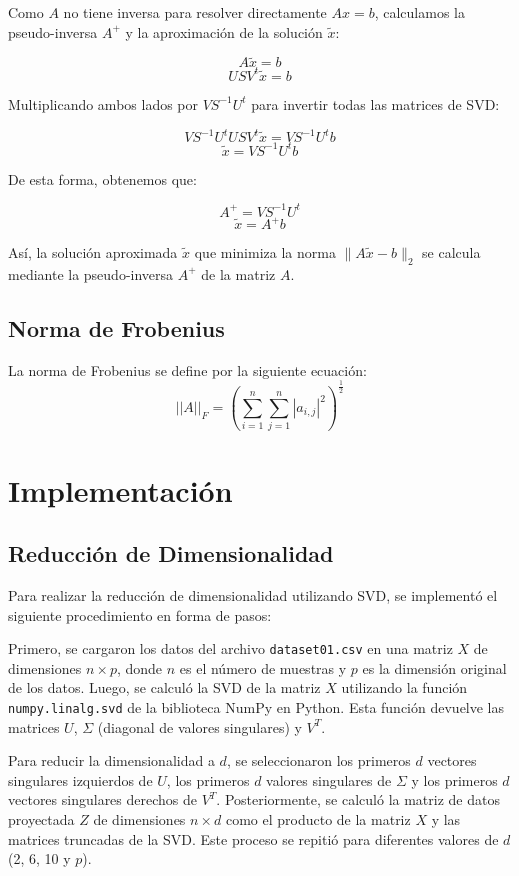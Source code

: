 \documentclass[12pt,a4]{article} %
\begin{document}
Como $A$ no tiene inversa para resolver directamente $Ax = b$, calculamos la pseudo-inversa $A^+$ y la aproximación de la solución $\tilde{x}$:

\[
A\tilde{x} = b
\]
\[
US V^t \tilde{x} = b
\]

Multiplicando ambos lados por $VS^{-1}U^t$ para invertir todas las matrices de SVD:

\[
VS^{-1}U^tUSV^t\tilde{x} = VS^{-1}U^tb
\]
\[
\tilde{x} = VS^{-1}U^tb
\]

De esta forma, obtenemos que:

\[
A^+ = VS^{-1}U^t
\]
\[
\tilde{x} = A^+b
\]

Así, la solución aproximada $\tilde{x}$ que minimiza la norma $\|A\tilde{x} - b\|_2$ se calcula mediante la pseudo-inversa $A^+$ de la matriz $A$.
\\

\subsection{Norma de Frobenius}
\label{Frobenius}
La norma de Frobenius se define por la siguiente ecuación:
\begin{equation}
    ||A||_F = \left(\sum_{i=1}^{n}\sum_{j=1}^{n} |a_{i,j}|^{2}\right)^{\frac{1}{2}}
\end{equation}

\section{Implementación}
\subsection{Reducción de Dimensionalidad}
Para realizar la reducción de dimensionalidad utilizando SVD, se implementó el siguiente procedimiento en forma de pasos:

Primero, se cargaron los datos del archivo \texttt{dataset01.csv} en una matriz $X$ de dimensiones $n \times p$, donde $n$ es el número de muestras y $p$ es la dimensión original de los datos. Luego, se calculó la SVD de la matriz $X$ utilizando la función \texttt{numpy.linalg.svd} de la biblioteca NumPy en Python. Esta función devuelve las matrices $U$, $\Sigma$ (diagonal de valores singulares) y $V^T$.

Para reducir la dimensionalidad a $d$, se seleccionaron los primeros $d$ vectores singulares izquierdos de $U$, los primeros $d$ valores singulares de $\Sigma$ y los primeros $d$ vectores singulares derechos de $V^T$. Posteriormente, se calculó la matriz de datos proyectada $Z$ de dimensiones $n \times d$ como el producto de la matriz $X$ y las matrices truncadas de la SVD. Este proceso se repitió para diferentes valores de $d$ (2, 6, 10 y $p$).
\end{document}
